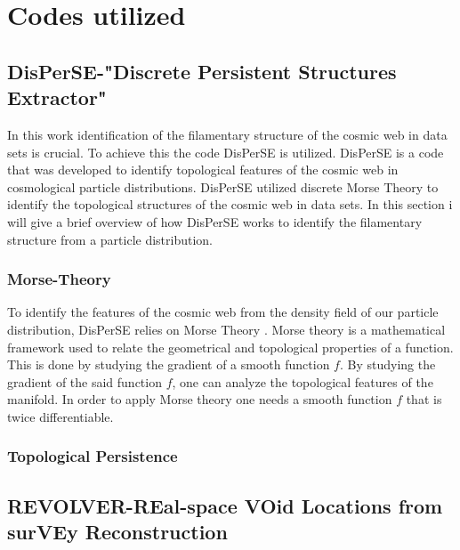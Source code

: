 \chapter{Codes utilized}
\section{DisPerSE-"Discrete Persistent Structures Extractor"}
In this work identification of the filamentary structure of the cosmic web in
data sets is crucial. To achieve this the code
DisPerSE is utilized.
DisPerSE is a code that was developed to identify topological features of the
cosmic web in cosmological particle distributions. DisPerSE utilized discrete
Morse Theory to identify the topological structures of the cosmic web in data
sets. In this section i will give a brief overview of how DisPerSE works to
identify the filamentary structure from a particle distribution.
\subsection{Morse-Theory}
To identify the features of the cosmic web from the density field of our
particle distribution, DisPerSE relies on Morse Theory \cite{Morse}. Morse
theory is a mathematical framework used to relate the geometrical and
topological properties of a function.
This is done by studying the gradient of a smooth function $f$. By studying the
gradient of the said function $f$, one can analyze the topological features of
the manifold. In order to apply Morse theory one needs a smooth function $f$
that is twice differentiable.
\subsection{Topological Persistence}

\section{REVOLVER-REal-space VOid Locations from surVEy Reconstruction}